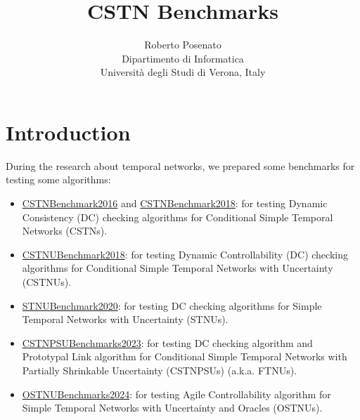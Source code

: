 \documentclass[a4paper,11pt]{article}
\begin{document}
\title{CSTN Benchmarks}
\author{Roberto Posenato\\
	Dipartimento di Informatica\\
	Università degli Studi di Verona, Italy}
\ifpdf
\maketitle
\fi

\section{Introduction}

During the research about temporal networks, we prepared some benchmarks for testing some algorithms:
\begin{itemize}
	\item  \href{https://profs.scienze.univr.it/~posenato/software/benchmarks/CSTNBenchmark2016.tgz}{CSTNBenchmark2016} and \href{http://profs.scienze.univr.it/~posenato/software/benchmarks/CSTNBenchmark2018.tgz}{CSTNBenchmark2018}: for testing Dynamic Consistency (DC) checking algorithms for Conditional Simple Temporal Networks (CSTNs).

	\item  \href{https://profs.scienze.univr.it/~posenato/software/benchmarks/CSTNUBenchmark2018.tgz}{CSTNUBenchmark2018}: for testing Dynamic Controllability (DC) checking algorithms for Conditional Simple Temporal Networks with Uncertainty (CSTNUs).

	\item \href{https://profs.scienze.univr.it/~posenato/software/benchmarks/STNUBenchmark2020.tgz}{STNUBenchmark2020}: for testing DC checking algorithms for Simple Temporal Networks with Uncertainty (STNUs).
	
	\item \href{https://profs.scienze.univr.it/~posenato/software/benchmarks/CSTNPSUBenchmarks2023.tgz}{CSTNPSUBenchmarks2023}: for testing DC checking algorithm and Prototypal Link algorithm for Conditional Simple Temporal Networks with Partially Shrinkable Uncertainty (CSTNPSUs) (a.k.a. FTNUs).
	
	\item \href{https://profs.scienze.univr.it/~posenato/software/benchmarks/OSTNUBenchmarks2024.tgz}{OSTNUBenchmarks2024}: for testing Agile Controllability algorithm for Simple Temporal Networks with Uncertainty and Oracles (OSTNUs).
\end{itemize}
\end{document}
